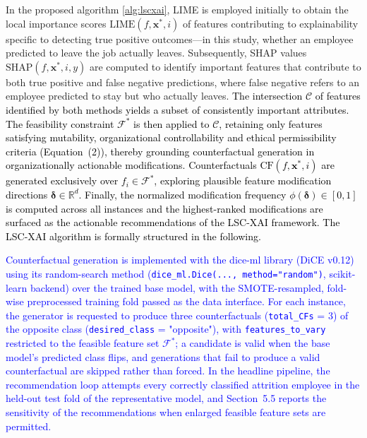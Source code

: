 \documentclass[a4paper,fleqn]{cas-sc}
\begin{document}
In the proposed algorithm \ref{alg:lscxai}, LIME is employed initially to obtain the local importance scores \(\text{LIME}(f, \mathbf{x}^*, i)\) of features contributing to explainability specific to detecting true positive outcomes—in this study, whether an employee predicted to leave the job actually leaves. Subsequently, SHAP values \(\text{SHAP}(f, \mathbf{x}^*, i, y)\) are computed to identify important features that contribute to both true positive and false negative predictions, where false negative refers to an employee predicted to stay but who actually leaves. \textcolor{black}{The intersection $\mathcal{C}$ of features identified by both methods yields a subset of consistently important attributes. The feasibility constraint $\mathcal{F}^*$ is then applied to $\mathcal{C}$, retaining only features satisfying mutability, organizational controllability and ethical permissibility criteria (Equation~(2)), thereby grounding counterfactual generation in organizationally actionable modifications. Counterfactuals $\text{CF}(f, \mathbf{x}^*, i)$ are generated exclusively over $f_i \in \mathcal{F}^*$, exploring plausible feature modification directions $\boldsymbol{\delta} \in \mathbb{R}^d$. Finally, the normalized modification frequency $\phi(\boldsymbol{\delta}) \in [0,1]$ is computed across all instances and the highest-ranked modifications are surfaced as the actionable recommendations of the LSC-XAI framework. The LSC-XAI algorithm is formally structured in the following.}

\textcolor{blue}{Counterfactual generation is implemented with the dice-ml library (DiCE v0.12) using its random-search method (\texttt{dice\_ml.Dice(..., method="random")}, scikit-learn backend) over the trained base model, with the SMOTE-resampled, fold-wise preprocessed training fold passed as the data interface. For each instance, the generator is requested to produce three counterfactuals (\texttt{total\_CFs} = 3) of the opposite class (\texttt{desired\_class} = "opposite"), with \texttt{features\_to\_vary} restricted to the feasible feature set $\mathcal{F}^*$; a candidate is valid when the base model's predicted class flips, and generations that fail to produce a valid counterfactual are skipped rather than forced. In the headline pipeline, the recommendation loop attempts every correctly classified attrition employee in the held-out test fold of the representative model, and Section~5.5 reports the sensitivity of the recommendations when enlarged feasible feature sets are permitted.}
\end{document}
